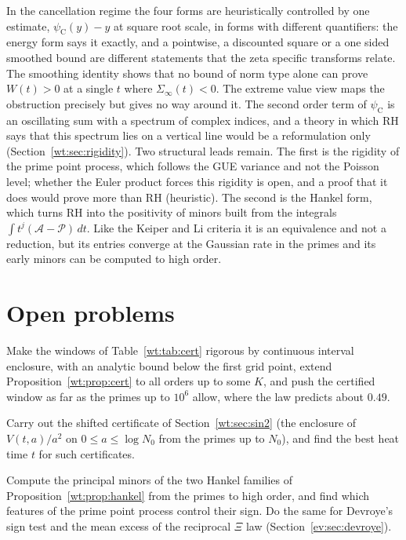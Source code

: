 In the cancellation regime the four forms are heuristically controlled by one estimate, $\psi_{\mathrm C}(y)-y$ at square root scale, in forms with different quantifiers: the energy form says it exactly, and a pointwise, a discounted square or a one sided smoothed bound are different statements that the zeta specific transforms relate. The smoothing identity shows that no bound of norm type alone can prove $W(t)>0$ at a single $t$ where $\Sigma_\infty(t)<0$. The extreme value view maps the obstruction precisely but gives no way around it. The second order term of $\psi_{\mathrm C}$ is an oscillating sum with a spectrum of complex indices, and a theory in which RH says that this spectrum lies on a vertical line would be a reformulation only (Section~\ref{wt:sec:rigidity}). Two structural leads remain. The first is the rigidity of the prime point process, which follows the GUE variance and not the Poisson level; whether the Euler product forces this rigidity is open, and a proof that it does would prove more than RH (heuristic). The second is the Hankel form, which turns RH into the positivity of minors built from the integrals $\int t^j(\mathcal A-\mathcal P)\,dt$. Like the Keiper and Li criteria it is an equivalence and not a reduction, but its entries converge at the Gaussian rate in the primes and its early minors can be computed to high order.

\section{Open problems}\label{yo:sec:open}\label{wt:sec:open}

\begin{problem}\label{wt:prob:cert}
Make the windows of Table~\ref{wt:tab:cert} rigorous by continuous interval enclosure, with an analytic bound below the first grid point, extend Proposition~\ref{wt:prop:cert} to all orders up to some $K$, and push the certified window as far as the primes up to $10^6$ allow, where the law predicts about $0.49$.
\end{problem}

\begin{problem}\label{wt:prob:shift}
Carry out the shifted certificate of Section~\ref{wt:sec:sin2} (the enclosure of $V(t,a)/a^2$ on $0\le a\le\log N_0$ from the primes up to $N_0$), and find the best heat time $t$ for such certificates.
\end{problem}

\begin{problem}\label{wt:prob:hankel}
Compute the principal minors of the two Hankel families of Proposition~\ref{wt:prop:hankel} from the primes to high order, and find which features of the prime point process control their sign. Do the same for Devroye's sign test and the mean excess of the reciprocal $\Xi$ law (Section~\ref{ev:sec:devroye}).
\end{problem}

